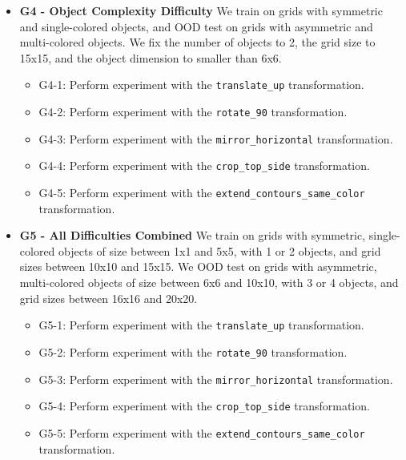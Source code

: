 \begin{itemize}
\begin{itemize}
\begin{itemize}
            \item G3-2: Perform experiment with the \texttt{rotate\_90} transformation.
            \item G3-3: Perform experiment with the \texttt{mirror\_horizontal} transformation.
            \item G3-4: Perform experiment with the \texttt{crop\_top\_side} transformation.
            \item G3-5: Perform experiment with the \texttt{extend\_contours\_same\_color} transformation.
        \end{itemize}
    \vspace{1em}
    \item \textbf{G4 - Object Complexity Difficulty} We train on grids with symmetric and single-colored objects, and OOD test on grids with asymmetric and multi-colored objects. We fix the number of objects to 2, the grid size to 15x15, and the object dimension to smaller than 6x6. 
    \begin{itemize}
            \item G4-1: Perform experiment with the \texttt{translate\_up} transformation.
            \item G4-2: Perform experiment with the \texttt{rotate\_90} transformation.
            \item G4-3: Perform experiment with the \texttt{mirror\_horizontal} transformation.
            \item G4-4: Perform experiment with the \texttt{crop\_top\_side} transformation.
            \item G4-5: Perform experiment with the \texttt{extend\_contours\_same\_color} transformation.
        \end{itemize}
    \vspace{1em}
    \item \textbf{G5 - All Difficulties Combined} We train on grids with symmetric, single-colored objects of size between 1x1 and 5x5, with 1 or 2 objects, and grid sizes between 10x10 and 15x15. We OOD test on grids with asymmetric, multi-colored objects of size between 6x6 and 10x10, with 3 or 4 objects, and grid sizes between 16x16 and 20x20. 
    \begin{itemize}
            \item G5-1: Perform experiment with the \texttt{translate\_up} transformation.
            \item G5-2: Perform experiment with the \texttt{rotate\_90} transformation.
            \item G5-3: Perform experiment with the \texttt{mirror\_horizontal} transformation.
            \item G5-4: Perform experiment with the \texttt{crop\_top\_side} transformation.
            \item G5-5: Perform experiment with the \texttt{extend\_contours\_same\_color} transformation.
        \end{itemize}
\end{itemize}




\end{itemize}
